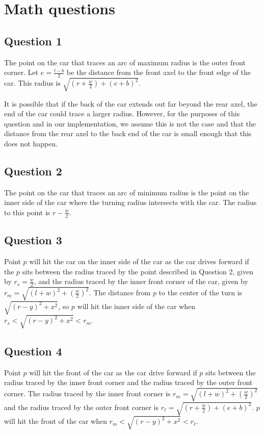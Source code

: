 \section{Math questions}

\subsection*{Question 1}
The point on the car that traces an arc of maximum radius is the outer front corner.  Let $e = \frac{l - b}{2}$ be the distance from the front axel to the front edge of the car. This radius is $\sqrt{(r + \frac{w}{2}) + (e + b)^2}$.

It is possible that if the back of the car extends out far beyond the rear axel, the end of the car could trace a larger radius. However, for the purposes of this question and in our implementation, we assume this is not the case and that the distance from the rear axel to the back end of the car is small enough that this does not happen.

\subsection*{Question 2}

The point on the car that traces an arc of minimum radius is the point on the inner side of the car where the turning radius intersects with the car. The radius to this point is $r - \frac{w}{2}$.

\subsection*{Question 3}
Point $p$ will hit the car on the inner side of the car as the car drives forward if the $p$ sits between the radius traced by the point described in Question 2, given by $r_s = \frac{w}{2}$, and the radius traced by the inner front corner of the car, given by $r_m = \sqrt{(l + w)^2 + (\frac{w}{2})^2}$. The distance from $p$ to the center of the turn is $\sqrt{(r - y)^2 + x^2}$, so $p$ will hit the inner side of the car when $r_s < \sqrt{(r - y)^2 + x^2} < r_m$.

\subsection*{Question 4}
Point $p$ will hit the front of the car as the car drive forward if $p$ sits between the radius traced by the inner front corner and the radius traced by the outer front corner. The radius traced by the inner front corner is $r_m = \sqrt{(l + w)^2 + (\frac{w}{2})^2}$ and the radius traced by the outer front corner is $r_\ell = \sqrt{(r + \frac{w}{2}) + (e + b)^2}$. $p$ will hit the front of the car when $r_m <  \sqrt{(r - y)^2 + x^2} < r_\ell$.

